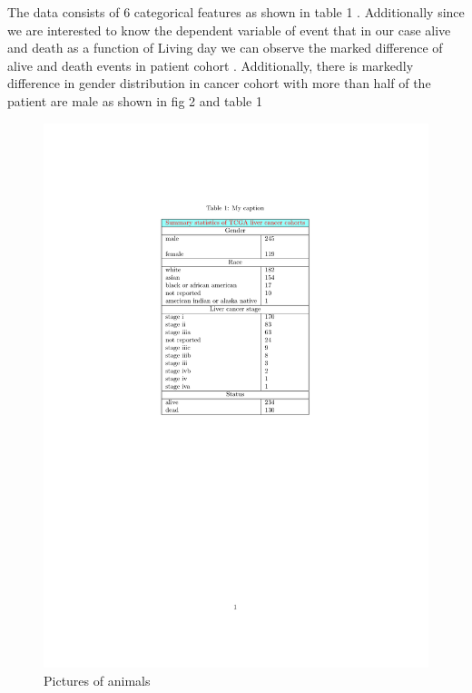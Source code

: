 \documentclass[a4paper,10pt]{article}
\begin{document}
 The data consists of 6 categorical features as shown in table 1 . Additionally since we are interested to know the dependent variable of event that in our case alive and death as a function of Living day we can observe the marked difference of alive and death events in patient cohort .  Additionally, there is markedly difference in gender distribution  in cancer cohort with more than half of the patient are male as shown in fig 2  and table 1

\begin{figure}[bh]
    \centering
      \includegraphics[width=\textwidth]{table.pdf}
    \caption{Pictures of animals}\label{fig:animals}
\end{figure}
  
\end{document}

